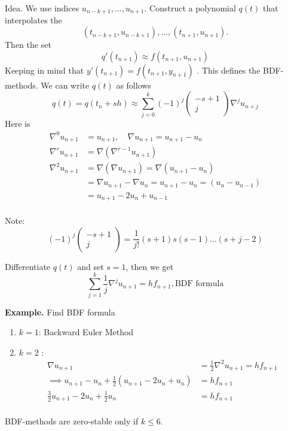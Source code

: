 \documentclass{article}
\theoremstyle{remark}
\begin{document}
Idea. We use indices $u_{n-k +1} , \ldots , u_{n+1}$. Construct a polynomial $q\left( t \right)$ that interpolates the \[
\left( t_{n-k +1} , u_{n-k+1} \right) , \ldots , \left( t_{n+1}, u_{n+1} \right). 
\] 
Then the set \[
q'  \left( t_{n+1} \right) \approx f\left( t_{n+1} , u_{n+1} \right)
\] 
Keeping in mind that $y' \left( t_{n+1} \right) = f\left( t_{n+1}, y_{n+1} \right)$ . This defines the BDF-methods. We can write $q\left( t \right)$ as follows \[
q\left( t \right) = q\left( t_{n} + sh \right) \approx \sum_{j=0}^{k} \left( -1 \right)^{j} \begin{pmatrix}
-s +1 \\
j
\end{pmatrix} 
\nabla ^{j} u_{n+j}
\] 
Here is \[
  \begin{split}
\nabla ^{0} u_{n+1} &=  u_{n+1}, \quad  \nabla u_{n+1} = u_{n+1} - u_{n}  \\
\nabla ^{r} u_{n+1}  & = \nabla \left( \nabla ^{r-1} u_{n+1} \right) \\
\nabla ^{2} u_{n+1} &=  \nabla \left( \nabla u_{n+1} \right) = \nabla \left( u_{n+1} - u_{n} \right) \\
&= \nabla u_{n+1} - \nabla u_{n} = u_{n+1} - u_{n} = \left( u_{n} - u_{n-1} \right) \\
&=  u_{n+1} - 2u_{n} + u_{n-1} \\
  \end{split} 
\] 
\begin{tcolorbox}
  Note:
  \[
  \left( -1 \right)^{j} \begin{pmatrix}
  -s + 1 \\
  j
  \end{pmatrix} 
  = \frac{1}{j!} \left( s+1 \right) s \left( s-1 \right) \ldots \left( s + j - 2 \right)
  \] 
\end{tcolorbox}

Differentiate $q\left( t \right)$ and set $s=1$, then we get \[
\sum_{j=1}^{k}  \frac{1}{j} \nabla ^{j} u_{n+1} = h f_{n+1} , \text{BDF formula} 
\] 
\begin{tcolorbox}
  \textbf{Example.} 
  Find BDF formula
  \begin{enumerate}[label=(\roman*)]
    \item  $k =1$: Backward Euler Method
    \item $k=2$ :  \[
        \begin{split}
    \nabla u_{n+1}  & = \frac{1}{2} \nabla ^{2} u_{n+1} = hf_{n+1} \\
    \implies u_{n+1} - u_{n} + \frac{1}{2} \left( u_{n+1} -2 u_{n} + u_{n} \right) &=  h f _{n+1}\\
    \frac{3}{2} u_{n+1} -2 u_{n} + \frac{1}{2} u_{n} &=  hf_{n+1} \\
        \end{split} 
    \] 
  \end{enumerate}
\end{tcolorbox}
BDF-methods are zero-stable only if $k \le 6$.
 
\end{document}
